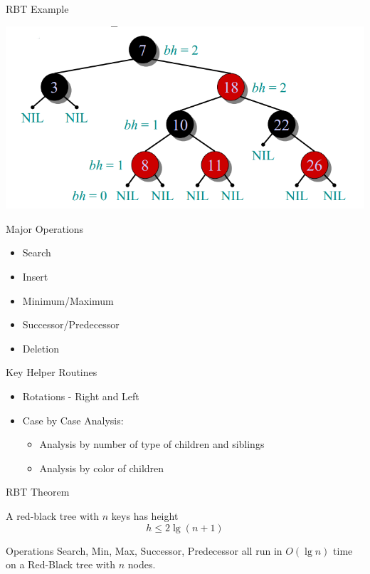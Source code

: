 \documentclass{beamer}
\begin{document}
\begin{frame}{RBT Example}
    \begin{center}
        \includegraphics[scale=0.4]{rbtEg2.png}
    \end{center}
\end{frame}


\begin{frame}{Major Operations}
    \begin{itemize}
        \item Search
        \item Insert
        \item Minimum/Maximum
        \item Successor/Predecessor
        \item Deletion
    \end{itemize}
\end{frame}

\begin{frame}{Key Helper Routines}
    \begin{itemize}
        \item Rotations - Right and Left
        \item Case by Case Analysis:
        \begin{itemize}
            \item Analysis by number of type of children and siblings
            \item Analysis by color of children
        \end{itemize}
    \end{itemize}
\end{frame}


\begin{frame}{RBT Theorem}
    \begin{theorem}
        A red-black tree with $n$ keys has height 
            $$h \leq 2 \lg (n+1)$$
    \end{theorem}
    \begin{corollary}
        Operations Search, Min, Max, Successor, Predecessor all run in $O(\lg n)$ time  
        on a Red-Black tree with $n$ nodes.
    \end{corollary}
\end{frame}
\end{document}
